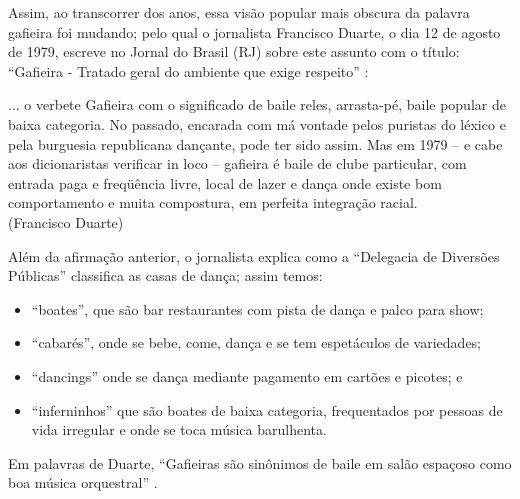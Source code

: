 Assim, ao transcorrer dos anos, essa visão popular mais obscura da palavra gafieira foi mudando;
pelo qual o jornalista Francisco Duarte, o dia 12 de agosto de 1979,
escreve no Jornal do Brasil (RJ) sobre este assunto com o título:
``Gafieira - Tratado geral do ambiente que exige respeito'' \cite[pp. 10]{respeitojournalbrasil1}:
\begin{citando}%
... o verbete Gafieira com o significado de baile reles, arrasta-pé, baile popular de baixa categoria.
No passado, encarada com má vontade pelos puristas do léxico e pela burguesia republicana dançante,
pode ter sido assim. Mas em 1979 -- e cabe aos dicionaristas verificar in loco --
gafieira é baile de clube particular, com entrada paga e freqüência livre, 
local de lazer e dança onde existe bom comportamento e muita compostura,
em perfeita integração racial.\\
(Francisco Duarte)
\end{citando}
Além da afirmação anterior, 
o jornalista explica como a ``Delegacia de Diversões Públicas'' classifica as casas de dança;
assim temos: 
\begin{itemize}
\item ``boates'', que são bar restaurantes com pista de dança e palco para show;
\item ``cabarés'', onde se bebe, come, dança e se tem espetáculos de variedades;
\item ``dancings'' onde se dança mediante pagamento em cartões e picotes; e 
\item ``inferninhos'' que são boates de baixa categoria, 
frequentados por pessoas de vida irregular e onde se toca música barulhenta.
\end{itemize} 
Em palavras de Duarte, ``Gafieiras são sinônimos de baile em salão espaçoso como boa música orquestral'' \cite[pp. 11]{respeitojournalbrasil1}.




